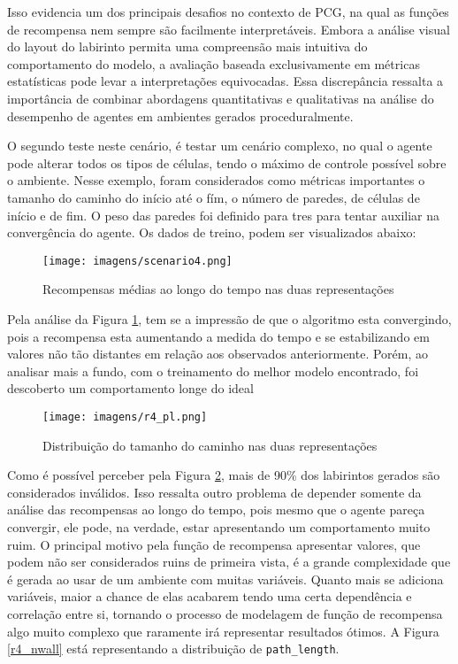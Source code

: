 Isso evidencia um dos principais desafios no contexto de PCG, na qual as funções de recompensa nem sempre são facilmente interpretáveis. 
Embora a análise visual do layout do labirinto permita uma compreensão mais intuitiva do comportamento do modelo, 
a avaliação baseada exclusivamente em métricas estatísticas pode levar a interpretações equivocadas. 
Essa discrepância ressalta a importância de combinar abordagens quantitativas e qualitativas na 
análise do desempenho de agentes em ambientes gerados proceduralmente.


O segundo teste neste cenário, é testar um cenário complexo, no qual o agente pode alterar todos os tipos de células, tendo 
o máximo de controle possível sobre o ambiente. Nesse exemplo, foram considerados como métricas importantes o tamanho do caminho
do início até o fím, o número de paredes, de células de início e de fim. O peso das paredes foi definido para tres para
tentar auxiliar na convergência do agente. Os dados de treino, podem ser visualizados abaixo:

\begin{figure}[htb]
	\caption{\label{scenario4}Recompensas médias ao longo do tempo nas duas representações}
	\begin{center}
	    \texttt{[image: imagens/scenario4.png]}
	\end{center}
\end{figure}

\FloatBarrier

Pela análise da Figura \ref{scenario4}, tem se a impressão de que o algoritmo esta convergindo, pois a recompensa esta aumentando a medida do
tempo e se estabilizando em valores não tão distantes em relação aos observados anteriormente. Porém, ao analisar mais a fundo, com
o treinamento do melhor modelo encontrado, foi descoberto um comportamento longe do ideal

\begin{figure}[htb]
	\caption{\label{r4_pl}Distribuição do tamanho do caminho nas duas representações}
	\begin{center}
	    \texttt{[image: imagens/r4\_pl.png]}
	\end{center}
\end{figure}

\FloatBarrier

Como é possível perceber pela Figura \ref{r4_pl}, mais de 90\% dos labirintos gerados são considerados inválidos. Isso ressalta outro 
problema de depender somente da análise das recompensas ao longo do tempo, pois mesmo que o agente pareça convergir, ele pode, 
na verdade, estar apresentando um comportamento muito ruim. O principal motivo pela função de recompensa apresentar valores, que 
podem não ser considerados ruins de primeira vista, é a grande complexidade que é gerada ao usar de um ambiente com muitas variáveis.
Quanto mais se adiciona variáveis, maior a chance de elas acabarem tendo uma certa dependência e correlação entre si, tornando o processo
de modelagem de função de recompensa algo muito complexo que raramente irá representar resultados ótimos. A Figura \ref{r4_nwall} 
está representando a distribuição de \texttt{path\_length}.

